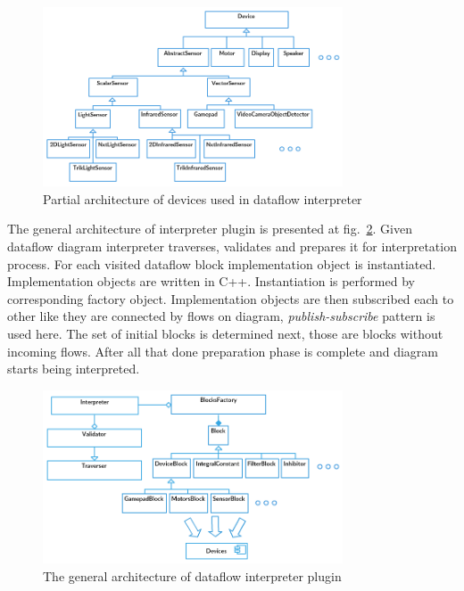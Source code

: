 \documentclass[conference,compsoc]{IEEEtran}
\begin{document}
\begin{figure}[ht]
	\centering
	\includegraphics[width=3.5in]{Devices.png}
	\caption{Partial architecture of devices used in dataflow interpreter}
	\label{image:devices-architecture}
\end{figure}

The general architecture of interpreter plugin is presented at fig.~\ref{image:interpreter-architecture}. Given dataflow diagram interpreter traverses, validates and prepares it for interpretation process. For each visited dataflow block implementation object is instantiated. Implementation objects are written in C++. Instantiation is performed by corresponding factory object. Implementation objects are then subscribed each to other like they are connected by flows on diagram, \textit{publish-subscribe} pattern is used here. The set of initial blocks is determined next, those are blocks without incoming flows. After all that done preparation phase is complete and diagram starts being interpreted.

\begin{figure}[ht]
	\centering
	\includegraphics[width=3.5in]{Interpreter.png}
	\caption{The general architecture of dataflow interpreter plugin}
	\label{image:interpreter-architecture}
\end{figure}
\end{document}
